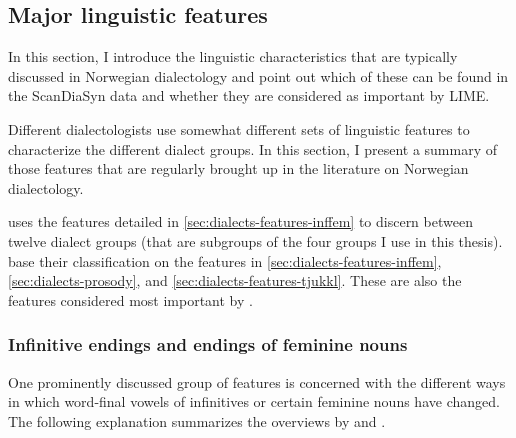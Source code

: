 \subsection{Major linguistic features}
\label{sec:dialects-results-lingmajor}

In this section, I introduce the linguistic characteristics that are typically discussed in Norwegian dialectology and point out which of these can be found in the ScanDiaSyn data and whether they are considered as important by LIME.

Different dialectologists use somewhat different sets of linguistic features to characterize the different dialect groups.
In this section, I present a summary of those features that are regularly brought up in the literature on Norwegian dialectology.

\citet[pp.~113--115]{sandoey1991dialektkunnskap} uses the features detailed in \autoref{sec:dialects-features-inffem} to discern between twelve dialect groups (that are subgroups of the four groups I use in this thesis).
\citet[pp.~32--42]{maehlum2012dialektlandskapet} base their classification on the features in \autoref{sec:dialects-features-inffem}, \autoref{sec:dialects-prosody}, and \autoref{sec:dialects-features-tjukkl}.
These are also the features considered most important by \citet{kaasen2020comparing}.


\subsubsection{Infinitive endings and endings of feminine nouns}
\label{sec:dialects-features-inffem}

One prominently discussed group of features is concerned with the different ways in which word-final vowels of infinitives or certain feminine nouns have changed.
The following explanation summarizes the overviews by 
\citet[pp.~33--35]{maehlum2012dialektlandskapet} and \citet[pp.~113--114]{sandoey1991dialektkunnskap}.

